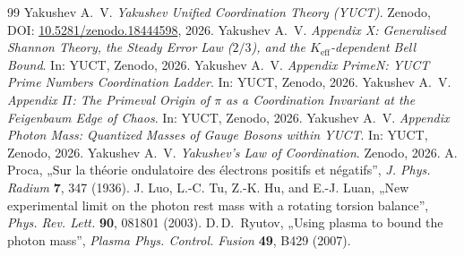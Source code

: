 \documentclass[11pt,a4paper]{article}
\begin{document}
	\begin{thebibliography}{99}
		Yakushev A.~V. \emph{Yakushev Unified Coordination Theory (YUCT)}. Zenodo, DOI: \href{https://doi.org/10.5281/zenodo.18444598}{10.5281/zenodo.18444598}, 2026.
		Yakushev A.~V. \emph{Appendix X: Generalised Shannon Theory, the Steady Error Law ($2/3$), and the $K_{\mathrm{eff}}$-dependent Bell Bound}. In: YUCT, Zenodo, 2026.
		Yakushev A.~V. \emph{Appendix PrimeN: YUCT Prime Numbers Coordination Ladder}. In: YUCT, Zenodo, 2026.
		Yakushev A.~V. \emph{Appendix $\Pi$: The Primeval Origin of $\pi$ as a Coordination Invariant at the Feigenbaum Edge of Chaos}. In: YUCT, Zenodo, 2026.
		Yakushev A.~V. \emph{Appendix Photon Mass: Quantized Masses of Gauge Bosons within YUCT}. In: YUCT, Zenodo, 2026.
		Yakushev A.~V. \emph{Yakushev's Law of Coordination}. Zenodo, 2026.
		A. Proca, „Sur la théorie ondulatoire des électrons positifs et négatifs'', \emph{J. Phys. Radium} \textbf{7}, 347 (1936).
		J. Luo, L.-C. Tu, Z.-K. Hu, and E.-J. Luan, „New experimental limit on the photon rest mass with a rotating torsion balance'', \emph{Phys. Rev. Lett.} \textbf{90}, 081801 (2003).
		D.\,D.\ Ryutov, „Using plasma to bound the photon mass'', \emph{Plasma Phys. Control. Fusion} \textbf{49}, B429 (2007).
	\end{thebibliography}
	
\end{document}
